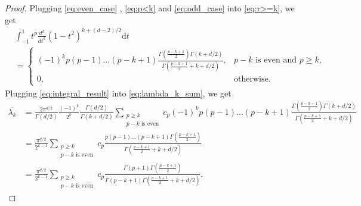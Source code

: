 \begin{proof}
Plugging \eqref{eq:even_case} , \eqref{eq:p<k} and \eqref{eq:odd_case} into \eqref{eq:r>=k}, we get
\begin{align}
    &\int_{-1}^1 t^p\frac{d^k}{dt^k}(1-t^2)^{k+(d-2)/2}\mathrm{d}t \nonumber\\
    &=
    \begin{cases}
    (-1)^k p(p-1)\ldots(p-k+1)\frac{\Gamma(\frac{p-k+1}{2})\Gamma(k+d/2)}{\Gamma(\frac{p-k+1}{2}+k+d/2)}, & p-k \text{ is even and } p\geq k, \\
    0, & \text{otherwise}.
    \end{cases}
    \label{eq:integral_result}
\end{align}
Plugging \eqref{eq:integral_result} into \eqref{eq:lambda_k_sum}, we get
\begin{align*}
\overline{\lambda_k} 
&= \frac{2\pi^{d/2}}{\Gamma(d/2)}\frac{(-1)^k}{2^k}\frac{\Gamma(d/2)}{\Gamma(k+d/2)}\sum_{\substack{p\geq k\\p-k\text{ is even}}} c_p (-1)^k p(p-1)\ldots(p-k+1)\frac{\Gamma(\frac{p-k+1}{2})\Gamma(k+d/2)}{\Gamma(\frac{p-k+1}{2}+k+d/2)}\\
&= \frac{\pi^{d/2}}{2^{k-1}}\sum_{\substack{p\geq k\\p-k\text{ is even}}} c_p \frac{ p(p-1)\ldots(p-k+1)\Gamma(\frac{p-k+1}{2})}{\Gamma(\frac{p-k+1}{2}+k+d/2)}\\
&= \frac{\pi^{d/2}}{2^{k-1}}\sum_{\substack{p\geq k\\p-k\text{ is even}}} c_p \frac{ \Gamma(p+1)\Gamma(\frac{p-k+1}{2})}{\Gamma(p-k+1)\Gamma(\frac{p-k+1}{2}+k+d/2)}.
\end{align*} 
\end{proof} 

\ReLUbiaszero* \label{cor:app:eigendecay} 

